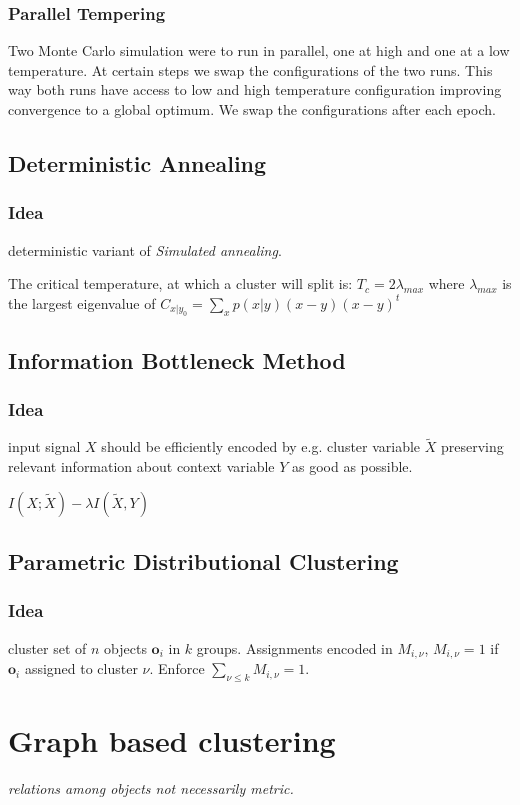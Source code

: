 \documentclass[9pt,parskip]{scrartcl}
\begin{document}
\begin{multicols*}{4}
\subsubsection*{Parallel Tempering}
Two Monte Carlo simulation were to run in parallel, one at high and one at a low temperature. At certain steps we swap the configurations of the two runs. This way both runs have access to low and high temperature configuration improving convergence to a global optimum. We swap the configurations after each epoch.
\subsection*{Deterministic Annealing}
\subsubsection*{Idea}
deterministic variant of \textit{Simulated annealing}.

The critical temperature, at which a cluster will split is:
$T_c = 2\lambda_{max}$ where $\lambda_{max}$ is the largest eigenvalue of $C_{x|y_0} = \sum_x p(x|y)(x-y)(x-y)^t$

\subsection*{Information Bottleneck Method}
\subsubsection*{Idea}
input signal $X$ should be efficiently encoded by e.g. cluster variable $\tilde{X}$ preserving relevant information about context variable $Y$ as good as possible.

$ I(X; \tilde{X}) - \lambda I(\tilde{X}, Y)$

\subsection*{Parametric Distributional Clustering}
\subsubsection*{Idea}
cluster set of $n$ objects $\mathbf{o}_i$ in $k$ groups. Assignments encoded in $M_{i, \nu}$, $M_{i, \nu} = 1$ if $\mathbf{o}_i$ assigned to cluster $\nu$. Enforce $\sum_{\nu \leq k} M_{i, \nu} = 1$.

\section*{Graph based clustering}
\textit{relations among objects not necessarily metric.}

\end{multicols*}
\end{document}
